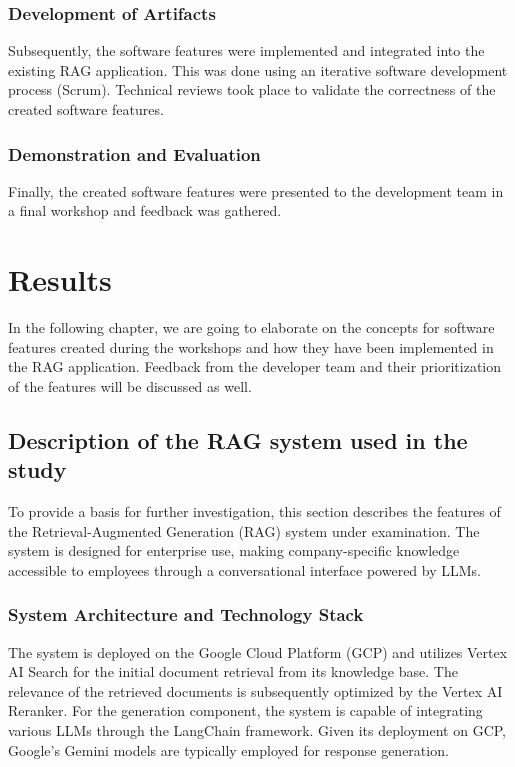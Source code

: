 \documentclass[
	english,
	ruledheaders=section,%
	class=report,%
	thesis={type=bachelor},%
	accentcolor=1b,%
	custommargins=true,%
	marginpar=false,%
	parskip=half-,%
	fontsize=11pt,%
	DIV=14,
]{tudapub}
\begin{document}
\subsection{Development of Artifacts}
Subsequently, the software features were implemented and integrated into the existing RAG application. This was done using an iterative software development process (Scrum). Technical reviews took place to validate the correctness of the created software features.
\subsection{Demonstration and Evaluation}
Finally, the created software features were presented to the development team in a final workshop and feedback was gathered.
\chapter{Results}
In the following chapter, we are going to elaborate on the concepts for software features created during the workshops and how they have been implemented in the RAG application. Feedback from the developer team and their prioritization of the features will be discussed as well.
\section{Description of the RAG system used in the study}
To provide a basis for further investigation, this section describes the features of the Retrieval-Augmented Generation (RAG) system under examination. The system is designed for enterprise use, making company-specific knowledge accessible to employees through a conversational interface powered by LLMs.

\subsection{System Architecture and Technology Stack}
The system is deployed on the Google Cloud Platform (GCP) and utilizes Vertex AI Search for the initial document retrieval from its knowledge base. The relevance of the retrieved documents is subsequently optimized by the Vertex AI Reranker. For the generation component, the system is capable of integrating various LLMs through the LangChain framework. Given its deployment on GCP, Google's Gemini models are typically employed for response generation.
\end{document}
